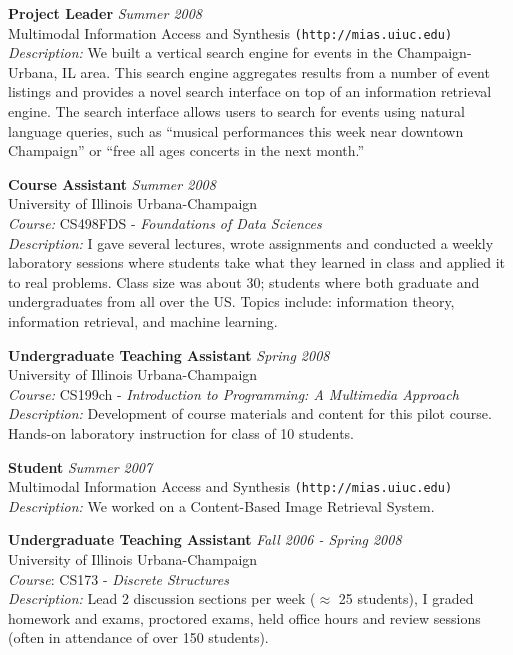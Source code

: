 \documentclass[margin]{res}
\begin{document}
\begin{resume}
				{\bf Project Leader} \hfill {\it Summer 2008} \\
				Multimodal Information Access and Synthesis \texttt{(http://mias.uiuc.edu)} \\
        {\sl Description:} We built a vertical search engine for events in the Champaign-Urbana, IL area. This search engine aggregates results from a number of event listings and provides a novel search interface on top of an information retrieval engine. The search interface allows users to search for events using natural language queries, such as ``musical performances this week near downtown Champaign'' or ``free all ages concerts in the next month.''

				{\bf Course Assistant} \hfill {\it Summer 2008} \\
        University of Illinois Urbana-Champaign \\
        {\sl Course:} CS498FDS - {\sl Foundations of Data Sciences} \\
				{\sl Description:} I gave several lectures, wrote assignments and conducted a weekly laboratory sessions where students take what they learned in class and applied it to real problems. Class size was about 30; students where both graduate and undergraduates from all over the US. Topics include: information theory, information retrieval, and machine learning.
				
				{\bf Undergraduate Teaching Assistant} \hfill {\it Spring 2008} \\
        University of Illinois Urbana-Champaign \\
        {\sl Course:} CS199ch - {\sl Introduction to Programming: A Multimedia Approach} \\
				{\sl Description:} Development of course materials and content for this pilot course. Hands-on laboratory instruction for class of 10 students.

				{\bf Student} \hfill {\it Summer 2007} \\
				Multimodal Information Access and Synthesis \texttt{(http://mias.uiuc.edu)} \\
				{\sl Description:} We worked on a Content-Based Image Retrieval System.
				
        {\bf Undergraduate Teaching Assistant} \hfill {\it Fall 2006 - Spring 2008} \\
        University of Illinois Urbana-Champaign \\
        {\sl Course}: CS173 - {\sl Discrete Structures} \\
				{\sl Description:}	Lead 2 discussion sections per week ($\approx$ 25 students), I graded homework and exams, proctored exams, held office hours and review sessions (often in attendance of over 150 students).
				

\end{resume}
\end{document}
